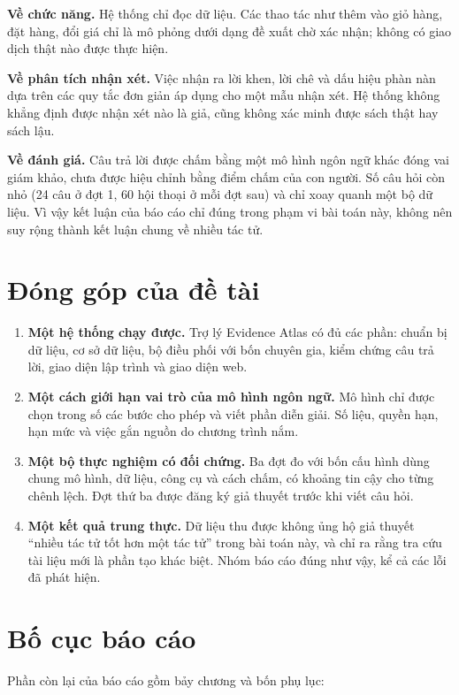 \textbf{Về chức năng.} Hệ thống chỉ đọc dữ liệu. Các thao tác như thêm vào giỏ hàng, đặt hàng, đổi giá chỉ là mô phỏng dưới dạng đề xuất chờ xác nhận; không có giao dịch thật nào được thực hiện.

\textbf{Về phân tích nhận xét.} Việc nhận ra lời khen, lời chê và dấu hiệu phàn nàn dựa trên các quy tắc đơn giản áp dụng cho một mẫu nhận xét. Hệ thống không khẳng định được nhận xét nào là giả, cũng không xác minh được sách thật hay sách lậu.

\textbf{Về đánh giá.} Câu trả lời được chấm bằng một mô hình ngôn ngữ khác đóng vai giám khảo, chưa được hiệu chỉnh bằng điểm chấm của con người. Số câu hỏi còn nhỏ (24 câu ở đợt 1, 60 hội thoại ở mỗi đợt sau) và chỉ xoay quanh một bộ dữ liệu. Vì vậy kết luận của báo cáo chỉ đúng trong phạm vi bài toán này, không nên suy rộng thành kết luận chung về nhiều tác tử.

\section{Đóng góp của đề tài}

\begin{enumerate}
    \item \textbf{Một hệ thống chạy được.} Trợ lý Evidence Atlas có đủ các phần: chuẩn bị dữ liệu, cơ sở dữ liệu, bộ điều phối với bốn chuyên gia, kiểm chứng câu trả lời, giao diện lập trình và giao diện web.
    \item \textbf{Một cách giới hạn vai trò của mô hình ngôn ngữ.} Mô hình chỉ được chọn trong số các bước cho phép và viết phần diễn giải. Số liệu, quyền hạn, hạn mức và việc gắn nguồn do chương trình nắm.
    \item \textbf{Một bộ thực nghiệm có đối chứng.} Ba đợt đo với bốn cấu hình dùng chung mô hình, dữ liệu, công cụ và cách chấm, có khoảng tin cậy cho từng chênh lệch. Đợt thứ ba được đăng ký giả thuyết trước khi viết câu hỏi.
    \item \textbf{Một kết quả trung thực.} Dữ liệu thu được không ủng hộ giả thuyết ``nhiều tác tử tốt hơn một tác tử'' trong bài toán này, và chỉ ra rằng tra cứu tài liệu mới là phần tạo khác biệt. Nhóm báo cáo đúng như vậy, kể cả các lỗi đã phát hiện.
\end{enumerate}

\section{Bố cục báo cáo}

Phần còn lại của báo cáo gồm bảy chương và bốn phụ lục:

